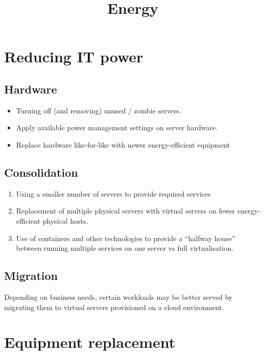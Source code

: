 \documentclass{pgnotes}
\title{Energy}
\begin{document}
\maketitle

\section{Reducing IT power}

\subsection{Hardware}

\begin{itemize}
\item Turning off (and removing) unused / zombie servers.
\item Apply available power management settings on server hardware.
\item Replace hardware like-for-like with newer energy-efficient equipment
\end{itemize}


\subsection{Consolidation}
\label{sec:consolidation}

\begin{enumerate}
\item Using a smaller number of servers to provide required services
\item Replacement of multiple physical servers with virtual servers on fewer energy-efficient physical hosts.
\item Use of containers and other technologies to provide a ``halfway house'' between running multiple services on one server vs full virtualisation.
\end{enumerate}

\subsection{Migration}

Depending on business needs, certain workloads may be better served by migrating them to virtual servers provisioned on a cloud environment. 

\section{Equipment replacement}
\end{document}
